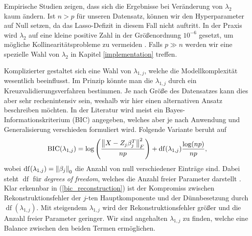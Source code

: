 Empirische Studien zeigen, dass sich die Ergebnisse bei Veränderung von $\lambda_2$ kaum ändern. Ist $n > p$ für unseren Datensatz, können wir den Hyperparameter auf Null setzen, da das Lasso-Defizit in diesem Fall nicht auftritt. In der Praxis wird $\lambda_2$ auf eine kleine positive Zahl in der Größenordnung $10^{-6}$ gesetzt, um mögliche Kollinearitätsprobleme zu vermeiden \cite{zou_sparsepca}. Falls $p \gg n$ werden wir eine spezielle Wahl von $\lambda_2$ in Kapitel \ref{implementation} treffen.

Komplizierter gestaltet sich eine Wahl von $\lambda_{1,j}$, welche die Modellkomplexität wesentlich beeinflusst. Im Prinzip könnte man die $\lambda_{1,j}$ durch ein Kreuzvalidierungsverfahren bestimmen. Je nach Größe des Datensatzes kann dies aber sehr rechenintensiv sein, weshalb wir hier einen alternativen Ansatz beschreiben möchten. In der Literatur wird meist ein Bayes-Informationskriterium (BIC) angegeben, welches aber je nach Anwendung und Generalisierung verschieden formuliert wird. Folgende Variante beruht auf \cite{hubert, allen}
\begin{align}
\label{bic_reconstruction}
\operatorname{BIC}(\lambda_{1,j}) = \log\left(\frac{\left\lVert X - Z_j\beta_j^T \right\rVert_{F}^{2}}{np}\right) + \operatorname{df}(\lambda_{1,j}) \frac{\log(np)}{np},
\end{align}
wobei $\operatorname{df}(\lambda_{1,j}) = \left\lVert \beta_j \right\rVert_0$ die Anzahl von null verschiedener Einträge sind. Dabei steht $\operatorname{df}$ für \textit{degrees of freedom}, welches die Anzahl freier Parameter darstellt \cite{hastie_elements}. Klar erkennbar in (\ref{bic_reconstruction}) ist der Kompromiss zwischen Rekonstruktionsfehler der $j$-ten Hauptkomponente und der Dünnbesetzung durch $\operatorname{df}(\lambda_{1,j})$. Mit steigendem $\lambda_{1,j}$ wird der Rekonstruktionsfehler größer und die Anzahl freier Parameter geringer. Wir sind angehalten $\lambda_{1,j}$ zu finden, welche eine Balance zwischen den beiden Termen ermöglichen.

